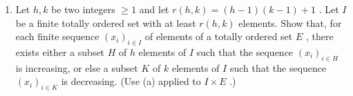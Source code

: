 \begin{enumerate}
\def\labelenumi{(\alph{enumi})}
\setcounter{enumi}{1}
\tightlist
\item
  Let \(h, k\) be two integers \(\geqslant 1\) and let \(r(h, k) = (h - 1)(k - 1) + 1\) . Let \(I\) be a finite totally ordered set with at least \(r(h, k)\) elements. Show that, for each finite sequence \((x_i)_{i \in I}\) of elements of a totally ordered set \(E\) , there exists either a subset \(H\) of \(h\) elements of \(I\) such that the sequence \((x_i)_{i \in H}\) is increasing, or else a subset \(K\) of \(k\) elements of \(I\) such that the sequence \((x_i)_{i \in K}\) is decreasing. (Use (a) applied to \(I \times E\) .)
\end{enumerate}

